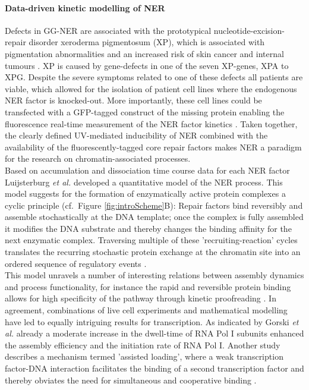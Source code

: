 \paragraph{Data-driven kinetic modelling of NER}
Defects in GG-NER are associated with the prototypical nucleotide-excision-repair disorder xeroderma pigmentosum (XP), which is associated with pigmentation abnormalities and an increased risk of skin cancer and internal tumours \cite{Hoeijmakers2009}. XP is caused by gene-defects in one of the seven XP-genes, XPA to XPG. Despite the severe symptoms related to one of these defects all patients are viable, which allowed for the isolation of patient cell lines where the endogenous NER factor is knocked-out. More importantly, these cell lines could be transfected with a GFP-tagged construct of the missing protein enabling the fluorescence real-time measurement of the NER factor kinetics \cite{Hoogstraten2002,Hoogstraten2008,Zotter2006,Rademakers2003}. Taken together, the clearly defined UV-mediated inducibility of NER combined with the availability of the fluorescently-tagged core repair factors makes NER a paradigm for the research on chromatin-associated processes.\\
Based on accumulation and dissociation time course data for each NER factor Luijsterburg \textit{et al.}\cite{Luijsterburg2010} developed a quantitative model of the NER process. This model suggests for the formation of enzymatically active protein complexes a cyclic principle (cf.\ Figure \ref{fig:introScheme}B): Repair factors bind reversibly and assemble stochastically at the DNA template; once the complex is fully assembled it modifies the DNA substrate and thereby changes the binding affinity for the next enzymatic complex. Traversing multiple of these 'recruiting-reaction' cycles translates the recurring stochastic protein exchange at the chromatin site into an ordered sequence of regulatory events \cite{Dinant:2009:J-Cell-Biol:19332890}.\\
This model unravels a number of interesting relations between assembly dynamics and process functionality, for instance the rapid and reversible protein binding allows for high specificity of the pathway through kinetic proofreading \cite{Luijsterburg2010}. In agreement, combinations of live cell experiments and mathematical modelling have led to equally intriguing results for transcription. As indicated by Gorski \textit{et al.} \cite{Gorski:2008:Mol-Cell:18498750} already a moderate increase in the dwell-time of RNA Pol I subunits enhanced the assembly efficiency and the initiation rate of RNA Pol I. Another study describes a mechanism termed 'assisted loading', where a weak transcription factor-DNA interaction facilitates the binding of a second transcription factor and thereby obviates the need for simultaneous and cooperative binding \cite{Voss2011}. \\         
